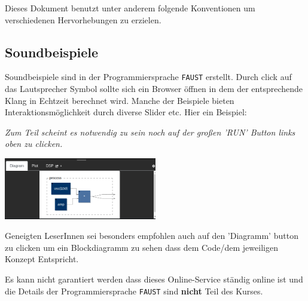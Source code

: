 \begin{multicols}{2}
Dieses Dokument benutzt unter anderem folgende Konventionen um verschiedenen Hervorhebungen zu erzielen. 

\subsection*{Soundbeispiele}

Soundbeispiele sind in der Programmiersprache \texttt{FAUST} erstellt. Durch click auf das Lautsprecher Symbol sollte sich ein Browser öffnen in dem der entsprechende Klang in Echtzeit berechnet wird. Manche der Beispiele bieten Interaktionsmöglichkeit durch diverse Slider etc. Hier ein Beispiel:


\emph{Zum Teil scheint es notwendig zu sein noch auf der großen 'RUN' Button links oben zu clicken.}


\begin{center}
    \includegraphics[width=0.5\textwidth]{img/faust_diag.png}
    \label{fig:faustBlock}
\end{center}


Geneigten LeserInnen sei besonders empfohlen auch auf den 'Diagramm' button zu clicken um ein Blockdiagramm zu sehen dass dem Code/dem jeweiligen Konzept Entspricht.

Es kann nicht garantiert werden dass dieses Online-Service ständig online ist und die Details der Programmiersprache \texttt{FAUST} sind \textbf{nicht} Teil des Kurses.


\end{multicols}
